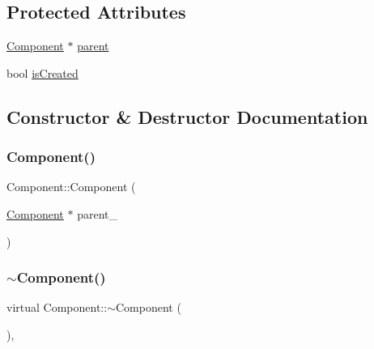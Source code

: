 \subsection*{Protected Attributes}
\begin{DoxyCompactItemize}
\item 
\hyperlink{classComponent}{Component} $\ast$ \hyperlink{classComponent_a8d7b023bf6615e457842e02e28d7ab07}{parent}
\item 
bool \hyperlink{classComponent_addf22788d84ea7450e70e8793dc2fe8d}{is\+Created}
\end{DoxyCompactItemize}


\subsection{Constructor \& Destructor Documentation}
\mbox{\label{classComponent_ad8fd006e351b2722c2e0f79010170a3c}} 
\subsubsection{\texorpdfstring{Component()}{Component()}\hspace{0.1cm}{\footnotesize\ttfamily [1/2]}}
{\footnotesize\ttfamily Component\+::\+Component (\begin{DoxyParamCaption}\item[{\hyperlink{classComponent}{Component} $\ast$}]{parent\+\_\+ }\end{DoxyParamCaption})\hspace{0.3cm}{\ttfamily [inline]}}

\mbox{\label{classComponent_ad82d7393e339c1b19cc17a0d55b5674d}} 
\subsubsection{\texorpdfstring{$\sim$\+Component()}{~Component()}\hspace{0.1cm}{\footnotesize\ttfamily [1/2]}}
{\footnotesize\ttfamily virtual Component\+::$\sim$\+Component (\begin{DoxyParamCaption}{ }\end{DoxyParamCaption})\hspace{0.3cm}{\ttfamily [virtual]}, {\ttfamily [default]}}

